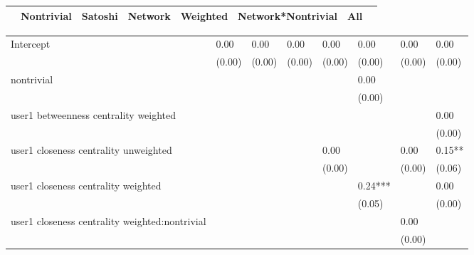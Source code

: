 \begin{table*}
\caption{Severity AND}
\begin{center}
\begin{tabular}{c|c|c|c|c|c|c|c|}
\hline
\Activity 									   & Nontrivial & Satoshi & Network & Weighted & Network*Nontrivial &   All    \\
\hline
\hline
\end{tabular}
\begin{tabular}{llllllll}
Intercept                                      & 0.00     & 0.00       & 0.00    & 0.00    & 0.00     & 0.00               & 0.00     \\
                                               & (0.00)   & (0.00)     & (0.00)  & (0.00)  & (0.00)   & (0.00)             & (0.00)   \\
nontrivial                                     &          &            &         &         & 0.00     &                    &          \\
                                               &          &            &         &         & (0.00)   &                    &          \\
user1 betweenness centrality weighted          &          &            &         &         &          &                    & 0.00     \\
                                               &          &            &         &         &          &                    & (0.00)   \\
user1 closeness centrality unweighted          &          &            &         & 0.00    &          & 0.00               & 0.15**   \\
                                               &          &            &         & (0.00)  &          & (0.00)             & (0.06)   \\
user1 closeness centrality weighted            &          &            &         &         & 0.24***  &                    & 0.00     \\
                                               &          &            &         &         & (0.05)   &                    & (0.00)   \\
user1 closeness centrality weighted:nontrivial &          &            &         &         &          & 0.00               &          \\
                                               &          &            &         &         &          & (0.00)             &          \\

\end{tabular}
\end{center}
\end{table*}
